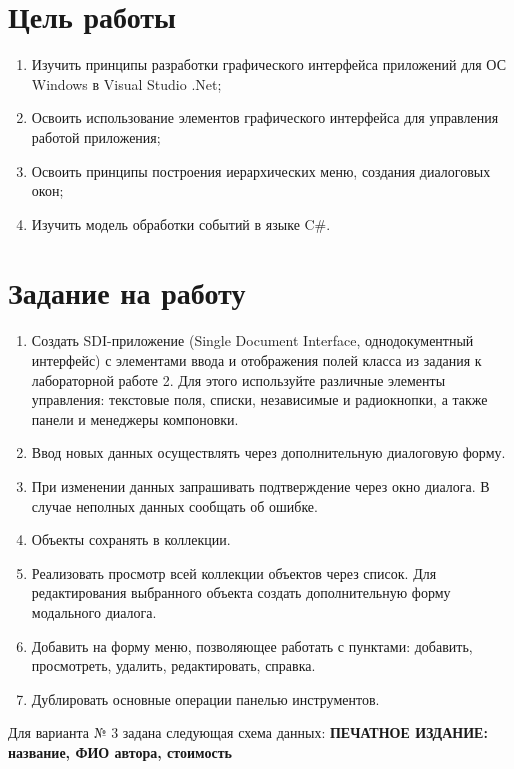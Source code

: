 \documentclass[a4paper,14pt]{extarticle}
\begin{document}


\section{Цель работы}
\begin{enumerate}
    \item Изучить принципы разработки графического интерфейса приложений для ОС
    Windows в Visual Studio .Net;
    \item Освоить использование элементов графического интерфейса для
    управления работой приложения;
    \item Освоить принципы построения иерархических меню,
    создания диалоговых окон;
    \item Изучить модель обработки событий в языке C\#.
\end{enumerate}

\section{Задание на работу}
\begin{enumerate}
    \item Создать SDI-приложение (Single Document Interface, однодокументный интерфейс)
    с элементами ввода и отображения полей класса из задания к лабораторной работе 2.
    Для этого используйте различные элементы управления: текстовые поля, списки,
    независимые и радиокнопки, а также панели и менеджеры компоновки.
    \item Ввод новых данных осуществлять через дополнительную диалоговую форму.
    \item При изменении данных запрашивать подтверждение через окно диалога.
    В случае неполных данных сообщать об ошибке.
    \item Объекты сохранять в коллекции.
    \item Реализовать просмотр всей коллекции объектов через список.
    Для редактирования выбранного объекта создать дополнительную форму
    модального диалога.
    \item Добавить на форму меню, позволяющее работать с пунктами:
    добавить, просмотреть, удалить, редактировать, справка.
    \item Дублировать основные операции панелью инструментов.
\end{enumerate}

Для варианта № 3 задана следующая схема данных:
\textbf{ПЕЧАТНОЕ ИЗДАНИЕ: название, ФИО автора, стоимость}
\end{document}
